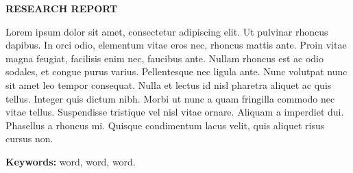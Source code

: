 \begin{center}
	\vspace{100pt}
	{\Large\sffamily\bfseries RESEARCH REPORT}
\end{center}
\noindent
Lorem ipsum dolor sit amet, consectetur adipiscing elit. Ut pulvinar rhoncus dapibus. In orci odio, elementum vitae eros nec, rhoncus mattis ante. Proin vitae magna feugiat, facilisis enim nec, faucibus ante. Nullam rhoncus est ac odio sodales, et congue purus varius. Pellentesque nec ligula ante. Nunc volutpat nunc sit amet leo tempor consequat. Nulla et lectus id nisl pharetra aliquet ac quis tellus. Integer quis dictum nibh. Morbi ut nunc a quam fringilla commodo nec vitae tellus. Suspendisse tristique vel nisl vitae ornare. Aliquam a imperdiet dui. Phasellus a rhoncus mi. Quisque condimentum lacus velit, quis aliquet risus cursus non.


\noindent
{\bfseries Keywords:} word, word, word.

\newpage